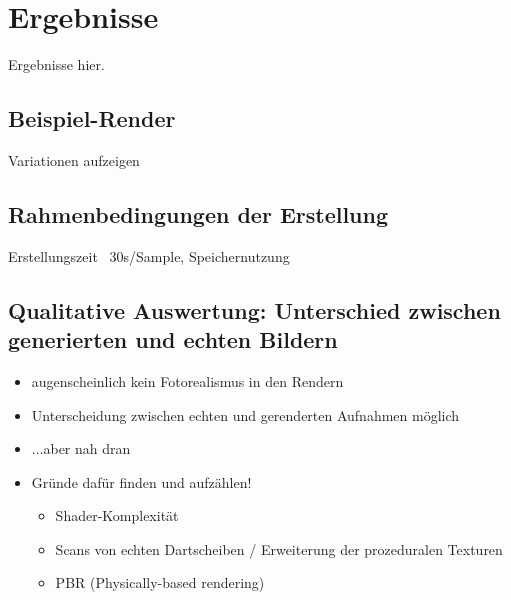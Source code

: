 
\section{Ergebnisse}
\label{sec:daten:ergebnisse}

Ergebnisse hier.

\subsection{Beispiel-Render}  %
\label{sec:render_beispiel}

Variationen aufzeigen

\todo{}


\subsection{Rahmenbedingungen der Erstellung}  %
\label{sec:render_info}

Erstellungszeit ~30s/Sample, Speichernutzung

\todo{}

\subsection{Qualitative Auswertung: Unterschied zwischen generierten und echten Bildern}  %
\label{sec:rendering_qualitativ}

\begin{itemize}
    \item augenscheinlich kein Fotorealismus in den Rendern
    \item Unterscheidung zwischen echten und gerenderten Aufnahmen möglich
    \item ...aber nah dran
    \item Gründe dafür finden und aufzählen!
          \begin{itemize}
              \item Shader-Komplexität
              \item Scans von echten Dartscheiben / Erweiterung der prozeduralen Texturen
              \item PBR (Physically-based rendering)
          \end{itemize}
\end{itemize}

\todo{}

